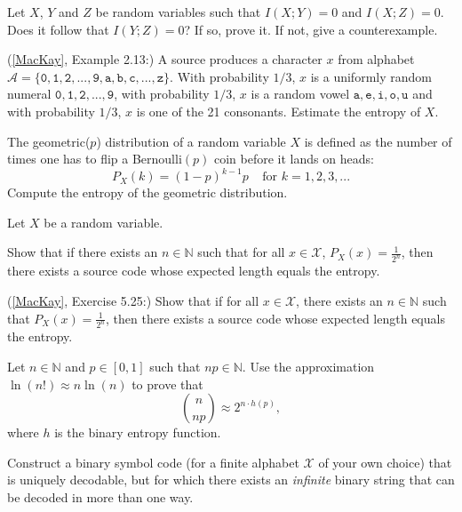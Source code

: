 \documentclass[a4paper,10pt,landscape,twocolumn]{scrartcl}
\begin{document}
\begin{exercise}
Let $X$, $Y$ and $Z$ be random variables such that $I(X;Y) = 0$ and $I(X;Z) = 0$. Does it follow that $I(Y;Z) = 0$? If so, prove it. If not, give a counterexample.
\end{exercise}

\begin{exercise}
(\href{http://www.inference.phy.cam.ac.uk/mackay/itila/book.html}{[MacKay]}, Example 2.13:) A source produces a character $x$ from alphabet $\mathcal{A} = \{\mathtt{0, 1, 2, ..., 9, a, b, c, ..., z}\}$. With probability $1/3$, $x$ is a uniformly random numeral $\mathtt{0,1,2,...,9}$, with probability $1/3$, $x$ is a random vowel $\mathtt{a,e,i,o,u}$ and with probability $1/3$, $x$ is one of the 21 consonants. Estimate the entropy of $X$.
\end{exercise}

\begin{exercise}
The geometric($p$) distribution of a random variable $X$ is defined as the number of times one has to flip a Bernoulli$(p)$ coin before it lands on heads:
\[
P_X(k) = (1-p)^{k-1}p \ \ \ \ \ \mbox{for } k = 1, 2, 3, ...
\]
Compute the entropy of the geometric distribution.
\end{exercise}

\begin{exercise}
Let $X$ be a random variable.
	\begin{subex}
	Show that if there exists an $n \in \mathbb{N}$ such that for all $x \in \mathcal{X}$, $P_X(x) = \frac{1}{2^n}$, then there exists a source code whose expected length equals the entropy.
	\end{subex}
	\begin{subex}
	(\href{http://www.inference.phy.cam.ac.uk/mackay/itila/book.html}{[MacKay]}, Exercise 5.25:) Show that if for all $x \in \mathcal{X}$, there exists an $n \in \mathbb{N}$ such that $P_X(x) = \frac{1}{2^n}$, then there exists a source code whose expected length equals the entropy.
	\end{subex}
\end{exercise}

\begin{exercise}
Let $n \in \mathbb{N}$ and $p \in [0,1]$ such that $np \in \mathbb{N}$. Use the approximation $\ln(n!) \approx n \ln(n)$ to prove that
\[
{n \choose np} \approx 2^{n \cdot h(p)},
\]
where $h$ is the binary entropy function.
\end{exercise}

\begin{bonusexercise}
Construct a binary symbol code (for a finite alphabet $\mathcal{X}$ of your own choice) that is uniquely decodable, but for which there exists an \emph{infinite} binary string that can be decoded in more than one way.
\end{bonusexercise}
\end{document}

